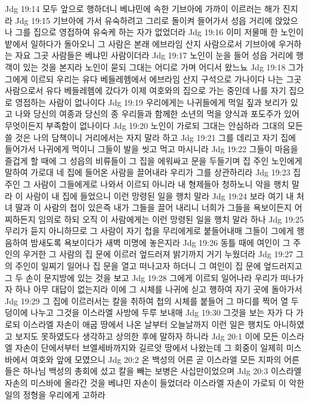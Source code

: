 Jdg 19:14  모두 앞으로 행하더니 베냐민에 속한 기브아에 가까이 이르러는 해가 진지라
Jdg 19:15  기브아에 가서 유숙하려고 그리로 돌이켜 들어가서 성읍 거리에 앉았으나 그를 집으로 영접하여 유숙케 하는 자가 없었더라
Jdg 19:16  이미 저물매 한 노인이 밭에서 일하다가 돌아오니 그 사람은 본래 에브라임 산지 사람으로서 기브아에 우거하는 자요 그곳 사람들은 베냐민 사람이더라
Jdg 19:17  노인이 눈을 들어 성읍 거리에 행객이 있는 것을 본지라 노인이 묻되 그대는 어디로 가며 어디서 왔느뇨
Jdg 19:18  그가 그에게 이르되 우리는 유다 베들레헴에서 에브라임 산지 구석으로 가나이다 나는 그곳 사람으로서 유다 베들레헴에 갔다가 이제 여호와의 집으로 가는 중인데 나를 자기 집으로 영접하는 사람이 없나이다
Jdg 19:19  우리에게는 나귀들에게 먹일 짚과 보리가 있고 나와 당신의 여종과 당신의 종 우리들과 함께한 소년의 먹을 양식과 포도주가 있어 무엇이든지 부족함이 없나이다
Jdg 19:20  노인이 가로되 그대는 안심하라 그대의 모든 쓸 것은 나의 담책이니 거리에서는 자지 말라 하고
Jdg 19:21  그를 데리고 자기 집에 들어가서 나귀에게 먹이니 그들이 발을 씻고 먹고 마시니라
Jdg 19:22  그들이 마음을 즐겁게 할 때에 그 성읍의 비류들이 그 집을 에워싸고 문을 두들기며 집 주인 노인에게 말하여 가로대 네 집에 들어온 사람을 끌어내라 우리가 그를 상관하리라
Jdg 19:23  집 주인 그 사람이 그들에게로 나와서 이르되 아니라 내 형제들아 청하노니 악을 행치 말라 이 사람이 내 집에 들었으니 이런 망령된 일을 행치 말라
Jdg 19:24  보라 여기 내 처녀 딸과 이 사람의 첩이 있은즉 내가 그들을 끌어 내리니 너희가 그들을 욕보이든지 어찌하든지 임의로 하되 오직 이 사람에게는 이런 망령된 일을 행치 말라 하나
Jdg 19:25  무리가 듣지 아니하므로 그 사람이 자기 첩을 무리에게로 붙들어내매 그들이 그에게 행음하여 밤새도록 욕보이다가 새벽 미명에 놓은지라
Jdg 19:26  동틀 때에 여인이 그 주인의 우거한 그 사람의 집 문에 이르러 엎드러져 밝기까지 거기 누웠더라
Jdg 19:27  그의 주인이 일찌기 일어나 집 문을 열고 떠나고자 하더니 그 여인이 집 문에 엎드러지고 그 두 손이 문지방에 있는 것을 보고
Jdg 19:28  그에게 이르되 일어나라 우리가 떠나가자 하나 아무 대답이 없는지라 이에 그 시체를 나귀에 싣고 행하여 자기 곳에 돌아가서
Jdg 19:29  그 집에 이르러서는 칼을 취하여 첩의 시체를 붙들어 그 마디를 찍어 열 두덩이에 나누고 그것을 이스라엘 사방에 두루 보내매
Jdg 19:30  그것을 보는 자가 다 가로되 이스라엘 자손이 애굽 땅에서 나온 날부터 오늘날까지 이런 일은 행치도 아니하였고 보지도 못하였도다 생각하고 상의한 후에 말하자 하니라
Jdg 20:1  이에 모든 이스라엘 자손이 단에서부터 브엘세바까지와 길르앗 땅에서 나왔는데 그 회중이 일제히 미스바에서 여호와 앞에 모였으니
Jdg 20:2  온 백성의 어른 곧 이스라엘 모든 지파의 어른들은 하나님 백성의 총회에 섰고 칼을 빼는 보병은 사십만이었으며
Jdg 20:3  이스라엘 자손의 미스바에 올라간 것을 베냐민 자손이 들었더라 이스라엘 자손이 가로되 이 악한 일의 정형을 우리에게 고하라
